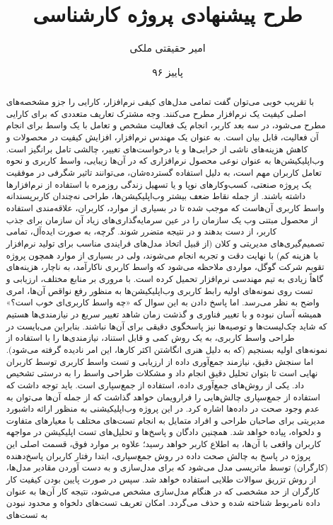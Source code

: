 \documentclass{article}
\title{طرح پیشنهادی پروژه کارشناسی}
\author{امیر حقیقتی ملکی}
\date{پاییز ۹۶}
\theoremstyle{definition}
\begin{document}
	\begin{titlepage}
		
	\end{titlepage}
	\newpage
	\begin{abstract}
		\thispagestyle{plain}
	با تقریب خوبی می‌توان گفت تمامی مدل‌های کیفی نرم‌افزار، کارایی را جزو مشخصه‌های اصلی کیفیت یک نرم‌افزار مطرح می‌کنند. وجه مشترک تعاریف متعددی که برای کارایی مطرح می‌شود، در سه بعد کاربر، انجام یک فعالیت مشخص و تعامل با یک واسط برای انجام آن فعالیت، قابل بیان است. به عنوان یک مهندس نرم‌افزار، افزایش کیفیت در محصولات و کاهش هزینه‌های ناشی از خرابی‌ها و یا درخواست‌های تغییر، چالشی تامل برانگیز است. وب‌اپلیکیشن‌ها به عنوان نوعی محصول نرم‌افزاری که در آن‌ها زیبایی، واسط کاربری و نحوه تعامل کاربران مهم است، به دلیل استفاده گسترده‌شان، می‌توانند تاثیر شگرفی در موفقیت یک پروژه صنعتی، کسب‌وکارهای نوپا و یا تسهیل زندگی روزمره با استفاده از نرم‌افزارها داشته باشند. از جمله نقاط ضعف بیشتر وب‌اپلیکیشن‌ها، طراحی نه‌چندان کاربرپسندانه واسط کاربری آن‌هاست که موجب شده تا در بسیاری از موارد، کاربران، علاقه‌مندی استفاده از محصول مبتنی وب یک سازمان را در عین سرمایه‌گذاری‌های زیاد آن سازمان برای جذب کاربر، از دست بدهند و در نتیجه متضرر شوند. گرچه، به صورت ایده‌آل، تمامی تصمیم‌گیری‌های مدیریتی و کلان (از قبیل اتخاذ مدل‌های فرایندی مناسب برای تولید نرم‌افزار با هزینه کم) با نهایت دقت و تجربه انجام می‌شوند، ولی در بسیاری از موارد همچون پروژه تقویم شرکت گوگل، مواردی ملاحظه می‌شود که واسط کاربری ناکارآمد، به ناچار، هزینه‌های گاهاً زیادی به تیم مهندسی نرم‌افزار تحمیل کرده است. با مروری بر منابع مختلف، ارزیابی و تست روی نمونه‌های اولیه رابط کاربری وب‌اپلیکیشن‌ها به منظور رفع نواقص آن‌ها، امری واضح به نظر می‌رسد. اما پاسخ دادن به این سوال که «چه واسط کاربری‌ای خوب است؟» همیشه آسان نبوده و با تغییر فناوری و گذشت زمان شاهد تغییر سریع در نیازمندی‌ها هستیم که شاید چک‌لیست‌ها و توصیه‌ها نیز پاسخگوی دقیقی برای آن‌ها نباشند. بنابراین می‌بایست در طراحی واسط کاربری، به یک روش کمی و قابل استناد، نیازمندی‌ها را با استفاده از نمونه‌های اولیه بسنجیم (که به دلیل هنری انگاشتن اکثر کارها، این امر نادیده گرفته می‌شود). اما سنجش دقیق، نیازمند جمع‌آوری داده از ارزیابی و تست واسط کاربری توسط کاربران نهایی است تا بتوان تحلیل دقیق انجام داد و مشکلات طراحی واسط را به درستی تشخیص داد. یکی از روش‌های جمع‌آوری داده، استفاده از جمع‌سپاری است. باید توجه داشت که استفاده از جمع‌سپاری چالش‌هایی را فرارویمان خواهد گذاشت که از جمله آن‌ها می‌توان به عدم وجود صحت در داده‌ها اشاره کرد. در این پروژه وب‌اپلیکیشنی به منظور ارائه داشبورد مدیریتی برای صاحبان طراحی و افراد متمایل به انجام تست‌های مختلف با معیارهای متفاوت و دلخواه، پیاده خواهد شد. همچنین دادگان و پاسخ‌ها و تحلیل‌های تست اپلیکیشن در مواجهه کاربران واقعی با آن‌ها، به اطلاع کاربر خواهد رسید؛ علاوه بر موارد فوق، قسمت اصلی این پروژه در پاسخ به چالش صحت داده در روش جمع‌سپاری، ابتدا رفتار کاربران پاسخ‌دهنده (کارگران) توسط ماتریسی مدل می‌شود که برای مدل‌سازی و به دست آوردن مقادیر مدل‌ها، از روش تزریق سوالات طلایی استفاده خواهد شد. سپس در صورت پایین بودن کیفیت کار کارگران از حد مشخصی که در هنگام مدل‌سازی مشخص می‌شود، نتیجه کار آن‌ها به عنوان داده نامربوط شناخته شده و حذف می‌گردد. امکان تعریف تست‌های دلخواه و محدود نبودن به تست‌های 
\end{abstract}
\end{document}
